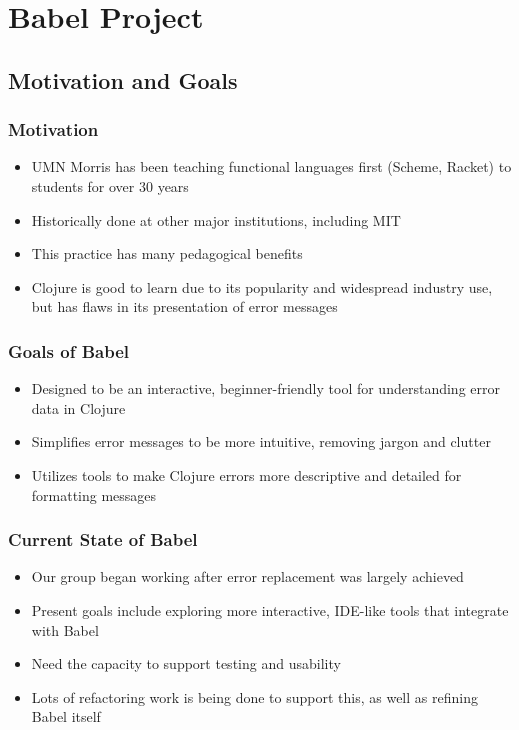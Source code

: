 \documentclass{beamer}
\begin{document}
\section{Babel Project}
\subsection{Motivation and Goals}

\begin{frame}
    \frametitle{Motivation}
    \begin{itemize}
	\item UMN Morris has been teaching functional languages first (Scheme, Racket) to students for over 30 years
         \item Historically done at other major institutions, including MIT
         \item This practice has many pedagogical benefits 
         \item Clojure is good to learn due to its popularity and widespread industry use, but has flaws in its presentation of error messages
    \end{itemize}
\end{frame}

\begin{frame}
    \frametitle{Goals of Babel}
    \begin{itemize}
        \item Designed to be an interactive, beginner-friendly tool for understanding error data in Clojure
        \item Simplifies error messages to be more intuitive, removing jargon and clutter
        \item Utilizes tools to make Clojure errors more descriptive and detailed for formatting messages
    \end{itemize}
\end{frame}

\begin{frame}
    \frametitle{Current State of Babel}
    \begin{itemize}
        \item Our group began working after error replacement was largely achieved
        \item Present goals include exploring more interactive, IDE-like tools that integrate with Babel
        \item Need the capacity to support testing and usability
        \item Lots of refactoring work is being done to support this, as well as refining Babel itself
    \end{itemize}
\end{frame}
\end{document}
